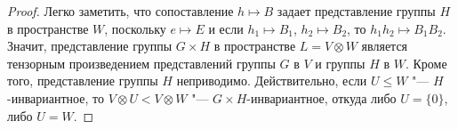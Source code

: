 \begin{proof}
	Легко заметить, что сопоставление $h \mapsto B$ задает представление группы $H$ в пространстве $W$, поскольку $e \mapsto E$ и если $h_1 \mapsto B_1$, $h_2 \mapsto B_2$, то $h_1h_2 \mapsto B_1B_2$. Значит, представление группы $G \times H$ в пространстве $L = V \otimes W$ является тензорным произведением представлений группы $G$ в $V$ и группы $H$ в $W$. Кроме того, представление группы $H$ неприводимо. Действительно, если $U \le W$ "--- $H$-инвариантное, то $V \otimes U < V \otimes W$ "--- $G \times H$-инвариантное, откуда либо $U = \{0\}$, либо $U = W$.
\end{proof}